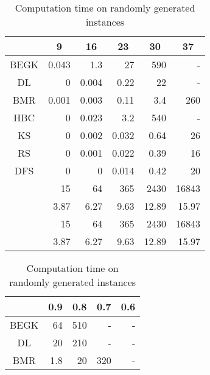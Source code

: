 \begin{table}
\begin{minipage}[t]{165pt}
\begin{center}
\caption{Computation time on self-dual Fano-plane graphs}
\label{sd_fano}
\begin{tabular}[c]{| r | r | r | r | r | r |}
\hline
\multicolumn{1}{|c||}{} & \multicolumn{1}{|c|}{9} & \multicolumn{1}{|c|}{16} & \multicolumn{1}{|c|}{23} & \multicolumn{1}{|c|}{30} & \multicolumn{1}{|c|}{37} \\\hline
\multicolumn{1}{|c||}{BEGK} & 0.043 & 1.3 & 27 & 590 & - \\\hline
\multicolumn{1}{|c||}{DL} & 0 & 0.004 & 0.22 & 22 & - \\\hline
\multicolumn{1}{|c||}{BMR} & 0.001 & 0.003 & 0.11 & 3.4 & 260 \\\hline
\multicolumn{1}{|c||}{HBC} & 0 & 0.023 & 3.2 & 540 & - \\\hline
\multicolumn{1}{|c||}{KS} & 0 & 0.002 & 0.032 & 0.64 & 26 \\\hline
\multicolumn{1}{|c||}{RS} & 0 & 0.001 & 0.022 & 0.39 & 16\\\hline
\multicolumn{1}{|c||}{DFS} & 0 & 0 & 0.014 & 0.42 & 20\\\hline
\hline
\multicolumn{1}{|c||}{} & 15 & 64 & 365 & 2430 & 16843\\\hline
\multicolumn{1}{|c||}{} & 3.87 & 6.27 & 9.63 & 12.89 & 15.97 \\\hline
\multicolumn{1}{|c||}{} & 15 & 64 & 365 & 2430 & 16843\\\hline
\multicolumn{1}{|c||}{} & 3.87 & 6.27 & 9.63 & 12.89 & 15.97 \\\hline
\end{tabular}
\end{center}
\end{minipage}
\begin{minipage}[t]{178pt}
\begin{center}
\caption{Computation time on randomly generated instances}
\label{p}
\begin{tabular}[c]{| r | r | r | r | r |}
\hline
\multicolumn{1}{|c||}{} & \multicolumn{1}{|c|}{0.9} & \multicolumn{1}{|c|}{0.8} & \multicolumn{1}{|c|}{0.7} & \multicolumn{1}{|c|}{0.6} \\\hline
\multicolumn{1}{|c||}{BEGK} & 64 & 510 & - & - \\\hline
\multicolumn{1}{|c||}{DL} & 20 & 210 & - & - \\\hline
\multicolumn{1}{|c||}{BMR} & 1.8 & 20 & 320 & - \\\hline

\end{tabular}
\end{center}
\end{minipage}
\end{table}
